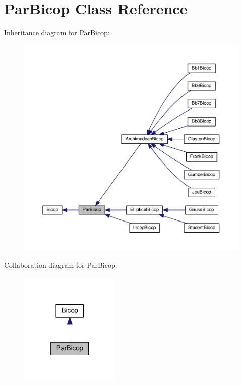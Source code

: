 \hypertarget{class_par_bicop}{}\section{Par\+Bicop Class Reference}
\label{class_par_bicop}


Inheritance diagram for Par\+Bicop\+:\nopagebreak
\begin{figure}[H]
\begin{center}
\leavevmode
\includegraphics[width=350pt]{class_par_bicop__inherit__graph}
\end{center}
\end{figure}


Collaboration diagram for Par\+Bicop\+:\nopagebreak
\begin{figure}[H]
\begin{center}
\leavevmode
\includegraphics[width=136pt]{class_par_bicop__coll__graph}
\end{center}
\end{figure}
